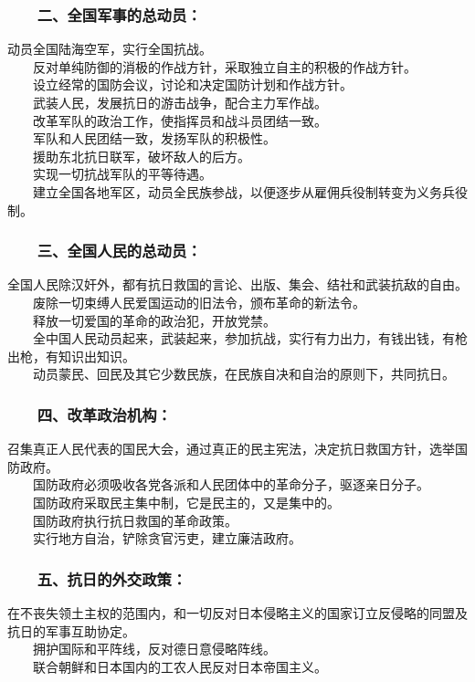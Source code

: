 \documentclass[cn,11pt,chinese]{elegantbook}
\def\myformat#1{\hfil\hfil #1}
\begin{document}
\subsubsection*{\myformat{　　二、全国军事的总动员：}}
动员全国陆海空军，实行全国抗战。\\
　　反对单纯防御的消极的作战方针，采取独立自主的积极的作战方针。\\
　　设立经常的国防会议，讨论和决定国防计划和作战方针。\\
　　武装人民，发展抗日的游击战争，配合主力军作战。\\
　　改革军队的政治工作，使指挥员和战斗员团结一致。\\
　　军队和人民团结一致，发扬军队的积极性。\\
　　援助东北抗日联军，破坏敌人的后方。\\
　　实现一切抗战军队的平等待遇。\\
　　建立全国各地军区，动员全民族参战，以便逐步从雇佣兵役制转变为义务兵役制。\\
\subsubsection*{\myformat{　　三、全国人民的总动员：}}
全国人民除汉奸外，都有抗日救国的言论、出版、集会、结社和武装抗敌的自由。\\
　　废除一切束缚人民爱国运动的旧法令，颁布革命的新法令。\\
　　释放一切爱国的革命的政治犯，开放党禁。\\
　　全中国人民动员起来，武装起来，参加抗战，实行有力出力，有钱出钱，有枪出枪，有知识出知识。\\
　　动员蒙民、回民及其它少数民族，在民族自决和自治的原则下，共同抗日。\\
\subsubsection*{\myformat{　　四、改革政治机构：}}
召集真正人民代表的国民大会，通过真正的民主宪法，决定抗日救国方针，选举国防政府。\\
　　国防政府必须吸收各党各派和人民团体中的革命分子，驱逐亲日分子。\\
　　国防政府采取民主集中制，它是民主的，又是集中的。\\
　　国防政府执行抗日救国的革命政策。\\
　　实行地方自治，铲除贪官污吏，建立廉洁政府。\\
\subsubsection*{\myformat{　　五、抗日的外交政策：}}
在不丧失领土主权的范围内，和一切反对日本侵略主义的国家订立反侵略的同盟及抗日的军事互助协定。\\
　　拥护国际和平阵线，反对德日意侵略阵线。\\
　　联合朝鲜和日本国内的工农人民反对日本帝国主义。\\
\end{document}
